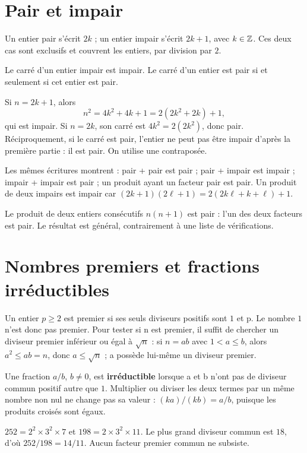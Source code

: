 \documentclass[../cours_2de.tex]{subfiles}
\begin{document}
\section{Pair et impair}
Un entier pair s'écrit $2k$ ; un entier impair s'écrit $2k+1$, avec $k\in\mathbb{Z}$. Ces deux cas sont exclusifs et couvrent les entiers, par division par $2$.
\begin{theoreme}
Le carré d'un entier impair est impair. Le carré d'un entier est pair si et seulement si cet entier est pair.
\end{theoreme}
\begin{demonstration}
Si $n=2k+1$, alors
\[
n^2=4k^2+4k+1=2(2k^2+2k)+1,
\]
qui est impair. Si $n=2k$, son carré est $4k^2=2(2k^2)$, donc pair. Réciproquement, si le carré est pair, l'entier ne peut pas être impair d'après la première partie : il est pair. On utilise une contraposée.
\end{demonstration}
Les mêmes écritures montrent : pair + pair est pair ; pair + impair est impair ; impair + impair est pair ; un produit ayant un facteur pair est pair. Un produit de deux impairs est impair car $(2k+1)(2\ell+1)=2(2k\ell+k+\ell)+1$.

\begin{exemple}
Le produit de deux entiers consécutifs $n(n+1)$ est pair : l'un des deux facteurs est pair. Le résultat est général, contrairement à une liste de vérifications.
\end{exemple}
\section{Nombres premiers et fractions irréductibles}
Un entier $p\ge2$ est premier si ses seuls diviseurs positifs sont $1$ et p. Le nombre $1$ n'est donc pas premier.
Pour tester si n est premier, il suffit de chercher un diviseur premier inférieur ou égal à $\sqrt n$ : si $n=ab$ avec $1<a\le b$, alors $a^2\le ab=n$, donc $a\le\sqrt n$ ; a possède lui-même un diviseur premier.

Une fraction $a/b$, $b\ne0$, est \textbf{irréductible} lorsque a et b n'ont pas de diviseur commun positif autre que $1$. Multiplier ou diviser les deux termes par un même nombre non nul ne change pas sa valeur : $(ka)/(kb)=a/b$, puisque les produits croisés sont égaux.
\begin{exemple}
$252=2^2\times3^2\times7$ et $198=2\times3^2\times11$. Le plus grand diviseur commun est $18$, d'où $252/198=14/11$. Aucun facteur premier commun ne subsiste.
\end{exemple}
\end{document}
